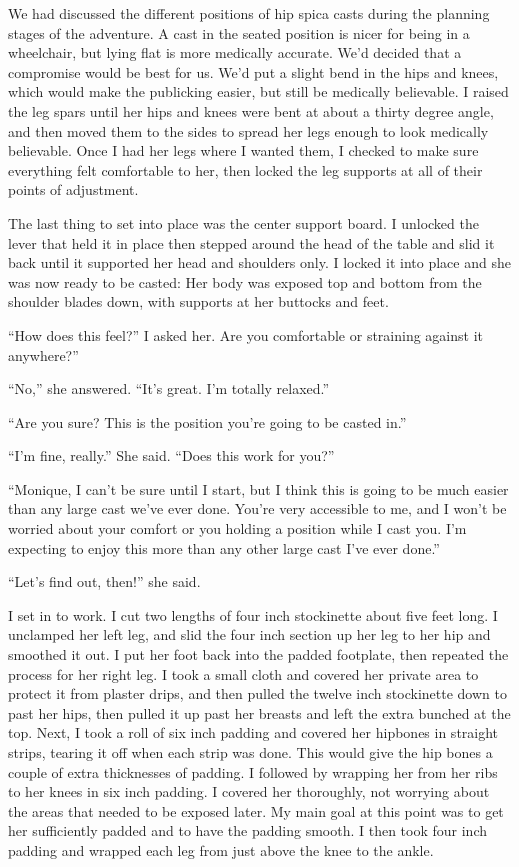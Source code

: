 We had discussed the different positions of hip spica casts during the planning stages of
the adventure. A cast in the seated position is nicer for being in a wheelchair, but lying flat
is more medically accurate. We'd decided that a compromise would be best for us. We'd put a
slight bend in the hips and knees, which would make the publicking easier, but still be
medically believable. I raised the leg spars until her hips and knees were bent at about a
thirty degree angle, and then moved them to the sides to spread her legs enough to look
medically believable. Once I had her legs where I wanted them, I checked to make sure everything
felt comfortable to her, then locked the leg supports at all of their points of adjustment.

The last thing to set into place was the center support board. I unlocked the lever that
held it in place then stepped around the head of the table and slid it back until it supported
her head and shoulders only. I locked it into place and she was now ready to be casted: Her body
was exposed top and bottom from the shoulder blades down, with supports at her buttocks and
feet.

``How does this feel?'' I asked her. Are you comfortable or straining against it anywhere?''

``No,'' she answered. ``It's great. I'm totally relaxed.''

``Are you sure? This is the position you're going to be casted in.''

``I'm fine, really.'' She said. ``Does this work for you?''

``Monique, I can't be sure until I start, but I think this is going to be much easier than
any large cast we've ever done. You're very accessible to me, and I won't be worried about your
comfort or you holding a position while I cast you. I'm expecting to enjoy this more than any
other large cast I've ever done.''

``Let's find out, then!'' she said.

I set in to work. I cut two lengths of four inch stockinette about five feet long. I
unclamped her left leg, and slid the four inch section up her leg to her hip and smoothed it
out. I put her foot back into the padded footplate, then repeated the process for her right leg.
I took a small cloth and covered her private area to protect it from plaster drips, and then
pulled the twelve inch stockinette down to past her hips, then pulled it up past her breasts and
left the extra bunched at the top. Next, I took a roll of six inch padding and covered her
hipbones in straight strips, tearing it off when each strip was done. This would give the hip
bones a couple of extra thicknesses of padding. I followed by wrapping her from her ribs to her
knees in six inch padding. I covered her thoroughly, not worrying about the areas that needed to
be exposed later. My main goal at this point was to get her sufficiently padded and to have the
padding smooth. I then took four inch padding and wrapped each leg from just above the knee to
the ankle.

